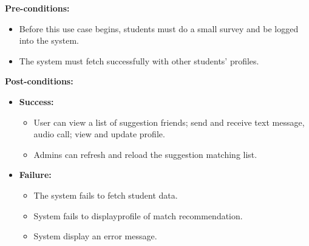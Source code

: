 \documentclass[12pt]{article}
\begin{document}
    \noindent \textbf{Pre-conditions:} 
        \begin{itemize}
            \item Before this use case begins, students must do a small survey and be logged into the system.
            \item The system must fetch successfully with other students’ profiles.
        \end{itemize}
    \noindent \textbf{Post-conditions:}
    \begin{itemize}
        \item \textbf{Success:}
        \begin{itemize}
            \item User can view a list of suggestion friends; send and receive text message, audio call; view and update profile.
            \item Admins can refresh and reload the suggestion matching list.
        \end{itemize}
        \item \textbf{Failure:}
        \begin{itemize}
            \item The system fails to fetch student data.
            \item System fails to displayprofile of match recommendation.
            \item System display an error message. 
        \end{itemize}
    \end{itemize}
\end{document}
